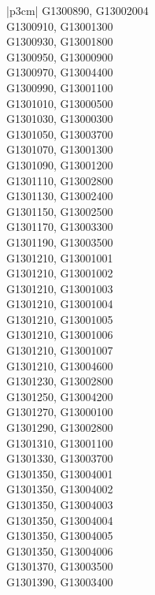 \begin{customLongTable}{ |p{3cm}| }
G1300890, G13002004 \\ \hline
G1300910, G13001300 \\ \hline
G1300930, G13001800 \\ \hline
G1300950, G13000900 \\ \hline
G1300970, G13004400 \\ \hline
G1300990, G13001100 \\ \hline
G1301010, G13000500 \\ \hline
G1301030, G13000300 \\ \hline
G1301050, G13003700 \\ \hline
G1301070, G13001300 \\ \hline
G1301090, G13001200 \\ \hline
G1301110, G13002800 \\ \hline
G1301130, G13002400 \\ \hline
G1301150, G13002500 \\ \hline
G1301170, G13003300 \\ \hline
G1301190, G13003500 \\ \hline
G1301210, G13001001 \\ \hline
G1301210, G13001002 \\ \hline
G1301210, G13001003 \\ \hline
G1301210, G13001004 \\ \hline
G1301210, G13001005 \\ \hline
G1301210, G13001006 \\ \hline
G1301210, G13001007 \\ \hline
G1301210, G13004600 \\ \hline
G1301230, G13002800 \\ \hline
G1301250, G13004200 \\ \hline
G1301270, G13000100 \\ \hline
G1301290, G13002800 \\ \hline
G1301310, G13001100 \\ \hline
G1301330, G13003700 \\ \hline
G1301350, G13004001 \\ \hline
G1301350, G13004002 \\ \hline
G1301350, G13004003 \\ \hline
G1301350, G13004004 \\ \hline
G1301350, G13004005 \\ \hline
G1301350, G13004006 \\ \hline
G1301370, G13003500 \\ \hline
G1301390, G13003400 \\ \hline

\end{customLongTable}
